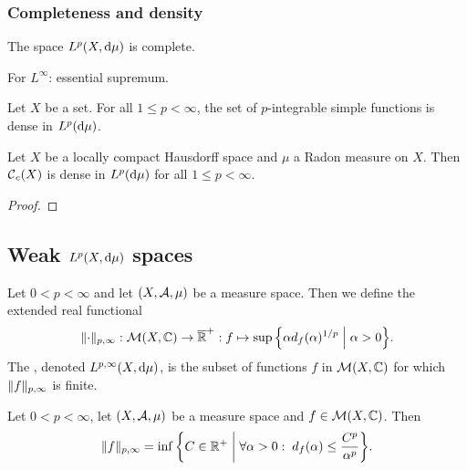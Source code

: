 \subsubsection{Completeness and density}
\begin{theorem}
The space $L^p(X,\operatorname{d \!}{\mu})$ is complete.
\end{theorem}

For $L^\infty$: essential supremum.

\begin{proposition}
Let $X$ be a set. For all $1\leq p < \infty$, the set of $p$-integrable simple functions is dense in $L^p(\operatorname{d \!}{\mu})$.
\end{proposition}


\begin{proposition}
Let $X$ be a locally compact Hausdorff space and $\mu$ a Radon measure on $X$. Then $\operatorname{\mathcal{C}}_c(X)$ is dense in $L^p(\operatorname{d \!}{\mu})$ for all $1\leq p < \infty$.
\end{proposition}
\begin{proof}

\end{proof}


\subsection{Weak $L^p(X,\operatorname{d \!}{\mu})$ spaces}
\begin{definition}
Let $0<p<\infty$ and let $\left( X,\mathcal{A}, \mu \right)$ be a measure space. Then we define the extended real functional
\[ \norm{\cdot}_{p,\infty}: \meas(X, \C)\to \overline{\R}^+: f\mapsto \sup\setbuilder{\alpha d_f(\alpha)^{1/p}}{\alpha > 0}. \]
The , denoted $L^{p,\infty}(X,\operatorname{d \!}{\mu})$, is the subset of functions $f$ in $\operatorname{\mathcal{M}}(X, \mathbb{C})$ for which $\lVert f\rVert_{p,\infty}$ is finite.
\end{definition}

\begin{lemma}
Let $0<p<\infty$, let $\left( X,\mathcal{A}, \mu \right)$ be a measure space and $f\in \operatorname{\mathcal{M}}(X, \mathbb{C})$. Then
\[ \norm{f}_{p,\infty} = \inf\setbuilder{C\in \R^+}{\forall \alpha>0: \; d_f(\alpha) \leq \frac{C^p}{\alpha^p}}. \]
\end{lemma}


